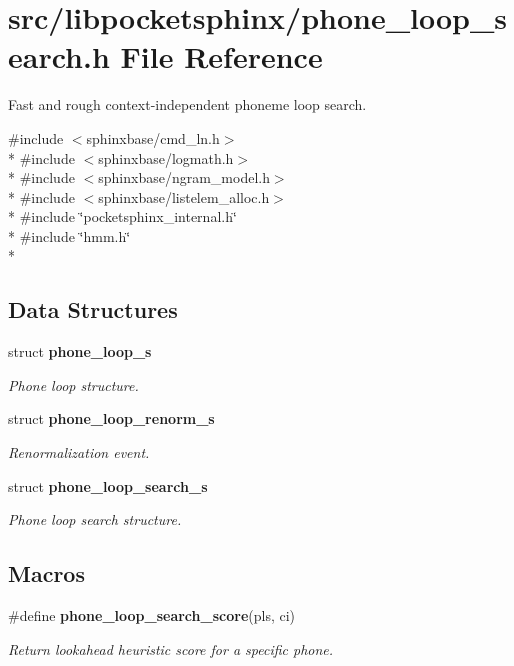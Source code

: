 \section{src/libpocketsphinx/phone\-\_\-loop\-\_\-search.h File Reference}
\label{phone__loop__search_8h}


Fast and rough context-\/independent phoneme loop search.  


{\ttfamily \#include $<$sphinxbase/cmd\-\_\-ln.\-h$>$}\\*
{\ttfamily \#include $<$sphinxbase/logmath.\-h$>$}\\*
{\ttfamily \#include $<$sphinxbase/ngram\-\_\-model.\-h$>$}\\*
{\ttfamily \#include $<$sphinxbase/listelem\-\_\-alloc.\-h$>$}\\*
{\ttfamily \#include \char`\"{}pocketsphinx\-\_\-internal.\-h\char`\"{}}\\*
{\ttfamily \#include \char`\"{}hmm.\-h\char`\"{}}\\*
\subsection*{Data Structures}
\begin{DoxyCompactItemize}
\item 
struct {\bf phone\-\_\-loop\-\_\-s}
\begin{DoxyCompactList}\small\item\em Phone loop structure. \end{DoxyCompactList}\item 
struct {\bf phone\-\_\-loop\-\_\-renorm\-\_\-s}
\begin{DoxyCompactList}\small\item\em Renormalization event. \end{DoxyCompactList}\item 
struct {\bf phone\-\_\-loop\-\_\-search\-\_\-s}
\begin{DoxyCompactList}\small\item\em Phone loop search structure. \end{DoxyCompactList}\end{DoxyCompactItemize}
\subsection*{Macros}
\begin{DoxyCompactItemize}
\item 
\#define {\bf phone\-\_\-loop\-\_\-search\-\_\-score}(pls, ci)
\begin{DoxyCompactList}\small\item\em Return lookahead heuristic score for a specific phone. \end{DoxyCompactList}\end{DoxyCompactItemize}
